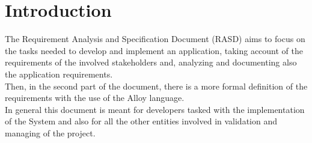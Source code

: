 \section{Introduction}
The Requirement Analysis and Specification Document (RASD) aims to focus on the tasks needed to develop and implement an application, taking account of the requirements of the involved stakeholders and, analyzing and documenting also the application requirements.\\
Then, in the second part of the document, there is a more formal definition of the requirements with the use of the Alloy language.\\
In general this document is meant for developers tasked with the implementation of the System and also for all the other entities involved in validation and managing of the project.

